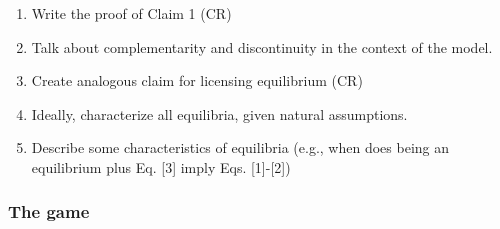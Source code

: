 \documentclass[11pt]{article}
\theoremstyle{plainCl1}
\begin{document}
\begin{enumerate}
\item Write the proof of Claim 1 (CR)
\item Talk about complementarity and discontinuity in the context of the model.
\item Create analogous claim for licensing equilibrium (CR)
\item Ideally, characterize all equilibria, given natural assumptions. 
\item Describe some characteristics of equilibria (e.g., when does being an equilibrium plus Eq. [3] imply Eqs. [1]-[2])
\end{enumerate}



\subsubsection{The game}
\end{document}
